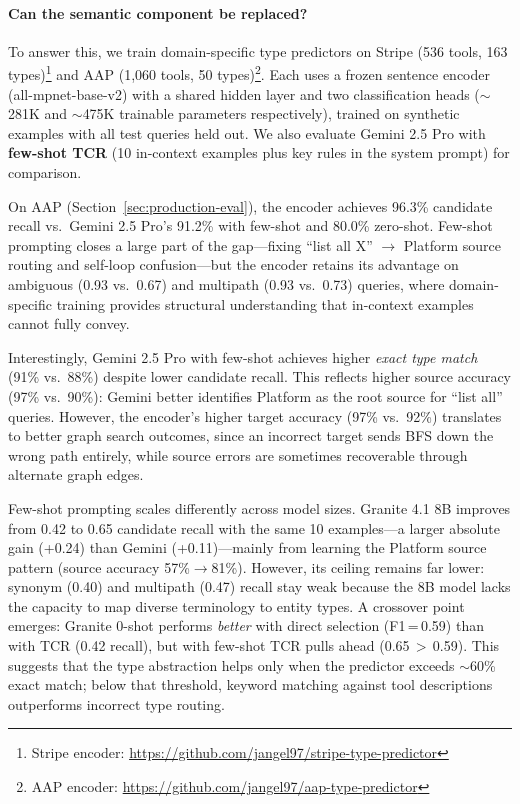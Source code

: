 \paragraph{Can the semantic component be replaced?}

To answer this, we train domain-specific type predictors on Stripe (536 tools, 163 types)\footnote{Stripe encoder: \url{https://github.com/jangel97/stripe-type-predictor}} and AAP (1,060 tools, 50 types)\footnote{AAP encoder: \url{https://github.com/jangel97/aap-type-predictor}}.
Each uses a frozen sentence encoder (all-mpnet-base-v2) with a shared hidden layer and two classification heads ($\sim$281K and $\sim$475K trainable parameters respectively), trained on synthetic examples with all test queries held out.
We also evaluate Gemini 2.5 Pro with \textbf{few-shot TCR} (10 in-context examples plus key rules in the system prompt) for comparison.

On AAP (Section~\ref{sec:production-eval}), the encoder achieves 96.3\% candidate recall vs.\ Gemini 2.5 Pro's 91.2\% with few-shot and 80.0\% zero-shot.
Few-shot prompting closes a large part of the gap---fixing ``list all X'' $\rightarrow$ Platform source routing and self-loop confusion---but the encoder retains its advantage on ambiguous (0.93 vs.\ 0.67) and multipath (0.93 vs.\ 0.73) queries, where domain-specific training provides structural understanding that in-context examples cannot fully convey.

Interestingly, Gemini 2.5 Pro with few-shot achieves higher \emph{exact type match} (91\% vs.\ 88\%) despite lower candidate recall.
This reflects higher source accuracy (97\% vs.\ 90\%): Gemini better identifies Platform as the root source for ``list all'' queries.
However, the encoder's higher target accuracy (97\% vs.\ 92\%) translates to better graph search outcomes, since an incorrect target sends BFS down the wrong path entirely, while source errors are sometimes recoverable through alternate graph edges.

Few-shot prompting scales differently across model sizes.
Granite 4.1 8B improves from 0.42 to 0.65 candidate recall with the same 10 examples---a larger absolute gain (+0.24) than Gemini (+0.11)---mainly from learning the Platform source pattern (source accuracy 57\%$\rightarrow$81\%).
However, its ceiling remains far lower: synonym (0.40) and multipath (0.47) recall stay weak because the 8B model lacks the capacity to map diverse terminology to entity types.
A crossover point emerges: Granite 0-shot performs \emph{better} with direct selection (F1\,=\,0.59) than with TCR (0.42 recall), but with few-shot TCR pulls ahead (0.65\,$>$\,0.59).
This suggests that the type abstraction helps only when the predictor exceeds ${\sim}$60\% exact match; below that threshold, keyword matching against tool descriptions outperforms incorrect type routing.

